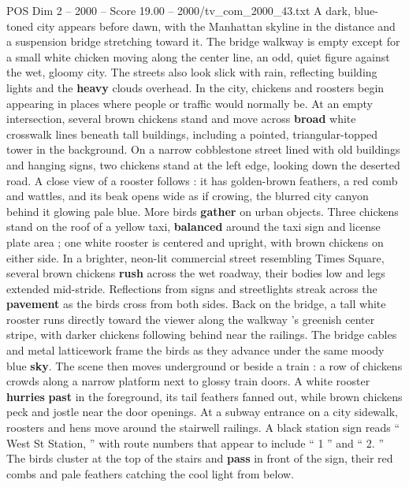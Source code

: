 \begin{textsample}{POS Dim 2 – 2000 – Score 19.00 – 2000/tv\_com\_2000\_43.txt}  \label{ex:f2_pos_028}
A dark, blue-toned city appears before dawn, with the Manhattan skyline in the distance and a suspension bridge stretching toward it.
The bridge walkway is empty except for a small white chicken moving along the center line, an odd, quiet figure against the wet, gloomy city.
The streets also look slick with rain, reflecting building lights and the \textbf{heavy} clouds overhead.
In the city, chickens and roosters begin appearing in places where people or traffic would normally be.
At an empty intersection, several brown chickens stand and move across \textbf{broad} white crosswalk lines beneath tall buildings, including a pointed, triangular-topped tower in the background.
On a narrow cobblestone street lined with old buildings and hanging signs, two chickens stand at the left edge, looking down the deserted road.
A close view of a rooster follows : it has golden-brown feathers, a red comb and wattles, and its beak opens wide as if crowing, the blurred city canyon behind it glowing pale blue.
More birds \textbf{gather} on urban objects.
Three chickens stand on the roof of a yellow taxi, \textbf{balanced} around the taxi sign and license plate area ; one white rooster is centered and upright, with brown chickens on either side.
In a brighter, neon-lit commercial street resembling Times Square, several brown chickens \textbf{rush} across the wet roadway, their bodies low and legs extended mid-stride.
Reflections from signs and streetlights streak across the \textbf{pavement} as the birds cross from both sides.
Back on the bridge, a tall white rooster runs directly toward the viewer along the walkway ’s greenish center stripe, with darker chickens following behind near the railings.
The bridge cables and metal latticework frame the birds as they advance under the same moody blue \textbf{sky}.
The scene then moves underground or beside a train : a row of chickens crowds along a narrow platform next to glossy train doors.
A white rooster \textbf{hurries} \textbf{past} in the foreground, its tail feathers fanned out, while brown chickens peck and jostle near the door openings.
At a subway entrance on a city sidewalk, roosters and hens move around the stairwell railings.
A black station sign reads “ West St Station, ” with route numbers that appear to include “ 1 ” and “ 2. ” The birds cluster at the top of the stairs and \textbf{pass} in front of the sign, their red combs and pale feathers catching the cool light from below.

\end{textsample}
